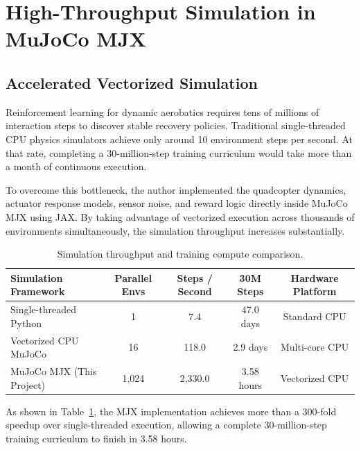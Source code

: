 \documentclass[11pt,a4paper]{article}
\begin{document}
\section{High-Throughput Simulation in MuJoCo MJX}
\label{sec:simulation}

\subsection{Accelerated Vectorized Simulation}
Reinforcement learning for dynamic aerobatics requires tens of millions of interaction steps to discover stable recovery policies. Traditional single-threaded CPU physics simulators achieve only around 10 environment steps per second. At that rate, completing a 30-million-step training curriculum would take more than a month of continuous execution.

To overcome this bottleneck, the author implemented the quadcopter dynamics, actuator response models, sensor noise, and reward logic directly inside MuJoCo MJX using JAX. By taking advantage of vectorized execution across thousands of environments simultaneously, the simulation throughput increases substantially.

\begin{table}[h!]
  \centering
  \small
  \caption{Simulation throughput and training compute comparison.}
  \label{tab:sim_benchmark}
  \begin{tabular*}{\textwidth}{@{\extracolsep{\fill}}lcccc@{}}
    \toprule
    Simulation Framework & Parallel Envs & Steps / Second & 30M Steps & Hardware Platform \\
    \midrule
    Single-threaded Python & 1 & 7.4 & 47.0 days & Standard CPU \\
    Vectorized CPU MuJoCo & 16 & 118.0 & 2.9 days & Multi-core CPU \\
    MuJoCo MJX (This Project) & 1,024 & 2,330.0 & 3.58 hours & Vectorized CPU \\
    \bottomrule
  \end{tabular*}
\end{table}

As shown in Table~\ref{tab:sim_benchmark}, the MJX implementation achieves more than a 300-fold speedup over single-threaded execution, allowing a complete 30-million-step training curriculum to finish in 3.58 hours.
\end{document}
